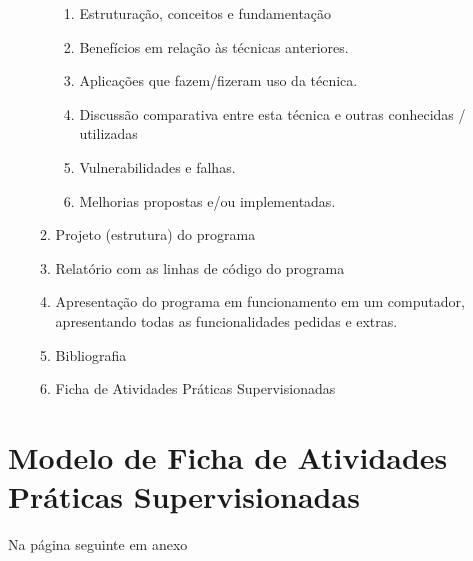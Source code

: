 \documentclass[12pt]{article}
\begin{document}
\begin{enumerate}
\begin{enumerate}
\begin{enumerate}
\item Estruturação, conceitos e fundamentação
\item Benefícios em relação às técnicas anteriores.
\item Aplicações que fazem/fizeram uso da técnica.
\item Discussão comparativa entre esta técnica e outras conhecidas /
utilizadas
\item Vulnerabilidades e falhas.
\item Melhorias propostas e/ou implementadas.

\end{enumerate}
\item Projeto (estrutura) do programa
\item Relatório com as linhas de código do programa
\item Apresentação do programa em funcionamento em um computador,
apresentando todas as funcionalidades pedidas e extras.
\item Bibliografia
\item Ficha de Atividades Práticas Supervisionadas
\end{enumerate}

\end{enumerate}

\section{Modelo de Ficha de Atividades Práticas Supervisionadas}
Na página seguinte em anexo




\end{document}
